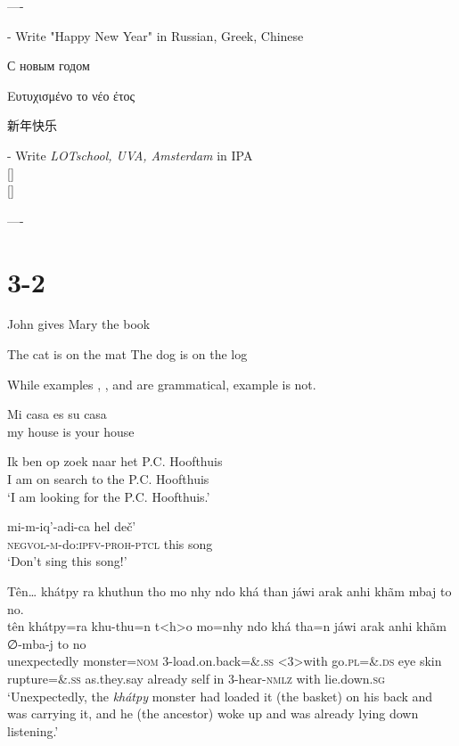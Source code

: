 \documentclass{scrartcl}
\begin{document}
----

- Write "Happy New Year" in Russian, Greek, Chinese 

С новым годом

Ευτυχισμένο το νέο έτος

\newfontfamily{}
\newcommand{\zh}[1]{{\cn #1}} 
{\cn 新年快乐}


- Write \textit{LOTschool, UVA, Amsterdam} in IPA\\{}
[\textipa{"lO\|[t sxo:l, "y:fa:, Amst@r"\|[dAm}]\\{}
[]

----

\section{3-2} 

\ea\label{ex:john}
John gives Mary the book
\z

\ea\label{ex:cat}
  \ea The cat is on the mat
  \ex The dog is on the log
  \z
\z

\ea
  \z
\z

While examples , , and  are grammatical, example  is not.
 
\ea 
\gll Mi casa es su casa\\
     my house is your house\\
\z

\ea
\gll Ik ben op zoek naar het P.C. Hoofthuis\\
     I  am  on search to the P.C. Hoofthuis\\
\glt `I am looking for the P.C. Hoofthuis.'
\z

\ea
\gll mi-m-iq’-adi-ca            hel deč’\\
\textsc{negvol}-\textsc{m}-do:\textsc{ipfv}-\textsc{proh}-\textsc{ptcl} this  song  \\
\glt   ‘Don’t sing this song!’
\z

\ea
Tên{\dots} khátpy ra khuthun tho mo nhy ndo khá than jáwi arak anhi khãm mbaj to no.\\
\gll   tên           khátpy=ra   khu-thu=n  t<h>o   mo=nhy   ndo khá  tha=n              jáwi        arak    anhi khãm ∅-mba-j             to   no    \\
      unexpectedly monster=\textsc{nom} 3-load.on.back=\&.\textsc{ss} <3>with go.\textsc{pl}=\&.\textsc{ds} eye skin rupture=\&.\textsc{ss} as.they.say already self in   3-hear-\textsc{nmlz} with lie.down.\textsc{sg}\\
\glt ‘Unexpectedly, the \textit{khátpy} monster had loaded it (the basket) on his back and was carrying it, and he (the ancestor) woke up and was already lying down listening.’
\z
\end{document}
